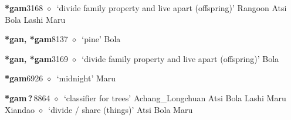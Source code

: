   \begin{list}{}{\leftmargin=1.5em \itemindent=-1.5em}
  \item {\footnotesize \textbf{*gam}}{\tiny 3168}
         $\diamond$~`divide family property and live apart (offspring)'
         Rangoon 
\hspace{1ex}
         Atsi 
\hspace{1ex}
         Bola 
\hspace{1ex}
         Lashi 
\hspace{1ex}
         Maru 
  \item {\footnotesize \textbf{*gan, *gam}}{\tiny 8137}
\hspace{1ex}
         $\diamond$~`pine'
         Bola 
  \item {\footnotesize \textbf{*gan, *gam}}{\tiny 3169}
\hspace{1ex}
         $\diamond$~`divide family property and live apart (offspring)'
         Bola 
  \item {\footnotesize \textbf{*gam}}{\tiny 6926}
\hspace{1ex}
         $\diamond$~`midnight'
         Maru 
  \item {\footnotesize \textbf{*gam\,?\,}}{\tiny 8864}
\hspace{1ex}
         $\diamond$~`classifier for trees'
         Achang\_Longchuan 
\hspace{1ex}
         Atsi 
\hspace{1ex}
         Bola 
\hspace{1ex}
         Lashi 
\hspace{1ex}
         Maru 
\hspace{1ex}
         Xiandao 
\hspace{1ex}
         $\diamond$~`divide / share (things)'
         Atsi 
\hspace{1ex}
         Bola 
\hspace{1ex}
         Maru 
\hspace{1ex}

\end{list}
